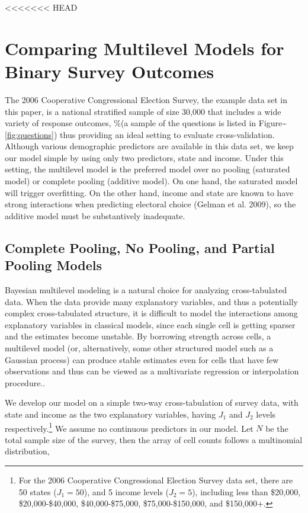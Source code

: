 \documentclass[11pt,article,oneside]{memoir}
\begin{document}
<<<<<<< HEAD
\section{Comparing Multilevel Models for Binary Survey
Outcomes}\label{comparing-multilevel-models-for-binary-survey-outcomes}

The 2006 Cooperative Congressional Election Survey, the example data set
in this paper, is a national stratified sample of size 30,000 that
includes a wide variety of response outcomes, \%(a sample of the
questions is listed in Figure\textasciitilde{}\ref{fig:questions}) thus
providing an ideal setting to evaluate cross-validation. Although
various demographic predictors are available in this data set, we keep
our model simple by using only two predictors, state and income. Under
this setting, the multilevel model is the preferred model over no
pooling (saturated model) or complete pooling (additive model). On one
hand, the saturated model will trigger overfitting. On the other hand,
income and state are known to have strong interactions when predicting
electoral choice (Gelman et al. 2009), so the additive model must be
substantively inadequate.

\subsection{Complete Pooling, No Pooling, and Partial Pooling
Models}\label{complete-pooling-no-pooling-and-partial-pooling-models}

Bayesian multilevel modeling is a natural choice for analyzing
cross-tabulated data. When the data provide many explanatory variables,
and thus a potentially complex cross-tabulated structure, it is
difficult to model the interactions among explanatory variables in
classical models, since each single cell is getting sparser and the
estimates become unstable. By borrowing strength across cells, a
multilevel model (or, alternatively, some other structured model such as
a Gaussian process) can produce stable estimates even for cells that
have few observations and thus can be viewed as a multivariate
regression or interpolation procedure..

We develop our model on a simple two-way cross-tabulation of survey
data, with state and income as the two explanatory variables, having
\(J_1\) and \(J_2\) levels
respectively.\footnote{For the 2006 Cooperative Congressional Election Survey
  data set, there are 50 states ($J_1=50$), and 5 income levels ($J_2=5$),
  including less than \$20,000, \$20,000-\$40,000, \$40,000-\$75,000,
  \$75,000-\$150,000, and \$150,000+.} We assume no continuous
predictors in our model. Let \(N\) be the total sample size of the
survey, then the array of cell counts follows a multinomial
distribution,
\end{document}
